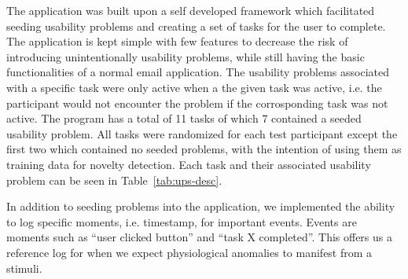 The application was built upon a self developed framework which facilitated seeding usability problems and creating a set of tasks for the user to complete. 
The application is kept simple with few features to decrease the risk of introducing unintentionally usability problems, while still having the basic functionalities of a normal email application.  
The usability problems associated with a specific task were only active when a the given task was active, i.e. the participant would not encounter the problem if the corrosponding task was not active.
The program has a total of 11 tasks of which 7 contained a seeded usability problem. 
All tasks were randomized for each test participant except the first two which contained no seeded problems, with the
intention of using them as training data for novelty detection. 
Each task and their associated usability problem can be seen in Table~\ref{tab:ups-desc}.

In addition to seeding problems into the application, we implemented the ability to log specific moments, i.e. timestamp,
for important events. Events are moments such as ``user clicked button'' and ``task X completed''. This offers us a
reference log for when we expect physiological anomalies to manifest from a stimuli.


